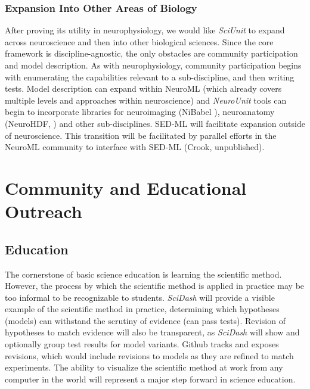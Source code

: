\documentclass[11pt,letterpaper]{article}
\begin{document}
\subsubsection{Expansion Into Other Areas of Biology}
After proving its utility in neurophysiology, we would like \textit{SciUnit} to expand across neuroscience and then into other biological sciences.  Since the core framework is discipline-agnostic, the only obstacles are community participation and model description.  As with neurophysiology, community participation begins with enumerating the capabilities relevant to a sub-discipline, and then writing tests.  Model description can expand within NeuroML (which already covers multiple levels and approaches within neuroscience) and \textit{NeuroUnit} tools can begin to incorporate libraries for neuroimaging (NiBabel \cite{nibabel_url}), neuroanatomy (NeuroHDF, \cite{neurohdf_url}) and other sub-disciplines.  SED-ML \cite{hucka_systems_2003,sedml_url} will facilitate expansion outside of neuroscience.  This transition will be facilitated by parallel efforts in the NeuroML community to interface with SED-ML (Crook, unpublished).    

\section{Community and Educational Outreach}
\subsection{Education}
The cornerstone of basic science education is learning the scientific method.  However, the process by which the scientific method is applied in practice may be too informal to be recognizable to students.  \textit{SciDash} will provide a visible example of the scientific method in practice, determining which hypotheses (models) can withstand the scrutiny of evidence (can pass tests).  Revision of hypotheses to match evidence will also be transparent, as \textit{SciDash} will show and optionally group test results for model variants.  Github tracks and exposes revisions, which would include revisions to models as they are refined to match experiments.  The ability to visualize the scientific method at work from any computer in the world will represent a major step forward in science education.  
\end{document}
